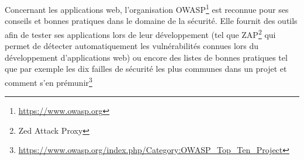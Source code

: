 Concernant les applications web, l'organisation \gls{OWASP}\footnote{\url{https://www.owasp.org}} est reconnue pour ses conseils et bonnes pratiques dans le domaine de la sécurité. Elle fournit des outils afin de tester ses applications lors de leur développement (tel que ZAP\footnote{Zed Attack Proxy} qui permet de détecter automatiquement les vulnérabilités connues lors du développement d'applications web) ou encore des listes de bonnes pratiques tel que par exemple les dix failles de sécurité les plus communes dans un projet et comment s'en prémunir\footnote{\url{https://www.owasp.org/index.php/Category:OWASP_Top_Ten_Project}}
